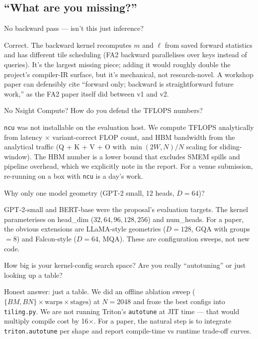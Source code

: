 \documentclass[11pt]{article}
\begin{document}
\subsection{``What are you missing?''}

\begin{question}{No backward pass --- isn't this just inference?}
\end{question}
\begin{answer}
Correct. The backward kernel recomputes $m$ and $\ell$ from saved forward
statistics and has different tile scheduling (FA2 backward parallelises over
keys instead of queries). It's the largest missing piece; adding it would
roughly double the project's compiler-IR surface, but it's mechanical, not
research-novel. A workshop paper can defensibly cite ``forward only;
backward is straightforward future work,'' as the FA2 paper itself did
between v1 and v2.
\end{answer}

\begin{question}{No Nsight Compute? How do you defend the TFLOPS numbers?}
\end{question}
\begin{answer}
\texttt{ncu} was not installable on the evaluation host. We compute TFLOPS
analytically from latency $\times$ variant-correct FLOP count, and HBM
bandwidth from the analytical traffic (Q + K + V + O with $\min(2W,N)/N$
scaling for sliding-window). The HBM number is a lower bound that excludes
SMEM spills and pipeline overhead, which we explicitly note in the report.
For a venue submission, re-running on a box with \texttt{ncu} is a
day's work.
\end{answer}

\begin{question}{Why only one model geometry (GPT-2 small, 12 heads, $D{=}64$)?}
\end{question}
\begin{answer}
GPT-2-small and BERT-base were the proposal's evaluation targets. The kernel
parameterises on head\_dim ($32, 64, 96, 128, 256$) and num\_heads. For a
paper, the obvious extensions are LLaMA-style geometries ($D{=}128$,
GQA with groups$=$8) and Falcon-style ($D{=}64$, MQA). These are configuration
sweeps, not new code.
\end{answer}

\begin{question}{How big is your kernel-config search space? Are you really
``autotuning'' or just looking up a table?}
\end{question}
\begin{answer}
Honest answer: just a table. We did an offline ablation sweep
($\{BM, BN\} \times \text{warps} \times \text{stages}$) at $N{=}2048$ and
froze the best configs into \texttt{tiling.py}. We are not running
Triton's \texttt{autotune} at JIT time --- that would multiply compile
cost by 16$\times$. For a paper, the natural step is to integrate
\texttt{triton.autotune} per shape and report compile-time vs
runtime trade-off curves.
\end{answer}
\end{document}
